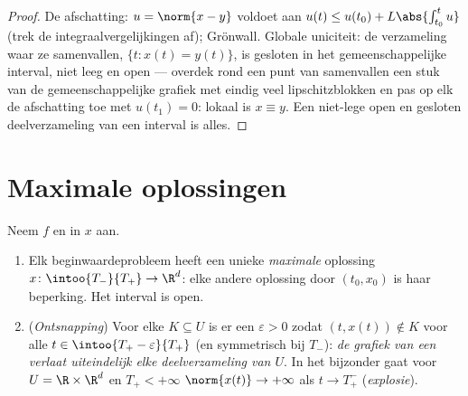 \begin{proof}
De afschatting: $u = \norm{x - y}$ voldoet aan $u(t) \leq u(t_0)
+ L\abs{\int_{t_0}^tu}$ (trek de integraalvergelijkingen af);
Grönwall. Globale uniciteit: de verzameling waar ze samenvallen,
$\{t : x(t) = y(t)\}$, is gesloten in het gemeenschappelijke
interval, niet leeg en open --- overdek rond een punt van
samenvallen een  stuk van de gemeenschappelijke grafiek
met eindig veel lipschitzblokken en pas op elk de afschatting toe
met $u(t_1) = 0$: lokaal is $x \equiv y$. Een niet-lege open en
gesloten deelverzameling van een interval is alles.
\end{proof}

\section{Maximale oplossingen}

\begin{theorem}
\label{thm:b3:ode:maximal}
Neem $f$  en  in $x$ aan.
\begin{enumerate}
  \item Elk beginwaardeprobleem heeft een unieke
        \emph{maximale} oplossing $x \colon \intoo{T_-}{T_+} \to
        \R^d$: elke andere oplossing door $(t_0, x_0)$ is haar
        beperking. Het interval is open.
  \item (\emph{Ontsnapping}) Voor elke  $K \subseteq U$
        is er een $\varepsilon > 0$ zodat $(t, x(t)) \notin K$
        voor alle $t \in \intoo{T_+ - \varepsilon}{T_+}$ (en
        symmetrisch bij $T_-$): \emph{de grafiek van een  verlaat uiteindelijk elke 
        deelverzameling van $U$}. In het bijzonder gaat voor $U =
        \R\times\R^d$ en $T_+ < +\infty$ $\norm{x(t)} \to
        +\infty$ als $t \to T_+^-$
        (\emph{explosie}).
\end{enumerate}
\end{theorem}

